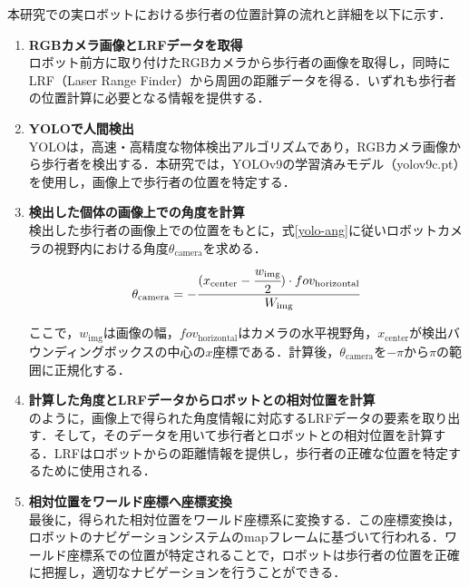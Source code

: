 \newpage

本研究での実ロボットにおける歩行者の位置計算の流れと詳細を以下に示す．

\begin{enumerate}
  \item \textbf{RGBカメラ画像とLRFデータを取得} \\
  ロボット前方に取り付けたRGBカメラから歩行者の画像を取得し，同時にLRF（Laser Range Finder）から周囲の距離データを得る．いずれも歩行者の位置計算に必要となる情報を提供する．

  \item \textbf{YOLOで人間検出} \\
  YOLO\cite{redmon2016you-yolo}は，高速・高精度な物体検出アルゴリズムであり，RGBカメラ画像から歩行者を検出する．本研究では，YOLOv9\cite{wang2025yolov9}の学習済みモデル（yolov9c.pt）を使用し，画像上で歩行者の位置を特定する．

  \item \textbf{検出した個体の画像上での角度を計算} \\
  検出した歩行者の画像上での位置をもとに，式\eqref{yolo-ang}に従いロボットカメラの視野内における角度$\theta_{\text{camera}}$を求める．
  \begin{equation}
    \theta_{\text{camera}} = - \cfrac{(x_{\text{center}} - \cfrac{w_{\text{img}}}{2}) \cdot fov_{\text{horizontal}}}{W_{\text{img}}} \label{yolo-ang}
  \end{equation}

  ここで，$w_{\text{img}}$は画像の幅，$fov_{\text{horizontal}}$はカメラの水平視野角，$x_{\text{center}}$が検出バウンディングボックスの中心の$x$座標である．計算後，$\theta_{\text{camera}}$を$-\pi \text{から} \pi$の範囲に正規化する．

  \item \textbf{計算した角度とLRFデータからロボットとの相対位置を計算} \\
  のように，画像上で得られた角度情報に対応するLRFデータの要素を取り出す．そして，そのデータを用いて歩行者とロボットとの相対位置を計算する．LRFはロボットからの距離情報を提供し，歩行者の正確な位置を特定するために使用される．

  \item \textbf{相対位置をワールド座標へ座標変換} \\
  最後に，得られた相対位置をワールド座標系に変換する．この座標変換は，ロボットのナビゲーションシステムのmapフレームに基づいて行われる．ワールド座標系での位置が特定されることで，ロボットは歩行者の位置を正確に把握し，適切なナビゲーションを行うことができる．
\end{enumerate}


